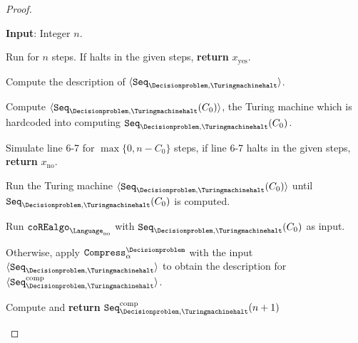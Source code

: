 \begin{proof}
\begin{algorithm}[H]
		\textbf{Input}: Integer $n$. 
		
		Run \Turingmachinehalt for $n$ steps. If \Turingmachinehalt halts in the given steps, \textbf{return} $x_{\text{yes}}$.
		
		Compute the description of $\langle \texttt{Seq}_{\Decisionproblem,\text{\Turingmachinehalt}} \rangle$.
		
		Compute $\langle \texttt{Seq}_{\Decisionproblem,\text{\Turingmachinehalt}}(C_0) \rangle$, the Turing machine which is hardcoded into computing $\texttt{Seq}_{\Decisionproblem,\text{\Turingmachinehalt}}(C_0)$.
		
		Simulate line 6-7 for $\max\{0, n - C_0\}$ steps, if line 6-7 halts in the given steps, \textbf{return} $x_{\text{no}}$.
		
		\Indp Run the Turing machine $\langle \texttt{Seq}_{\Decisionproblem,\text{\Turingmachinehalt}}(C_0) \rangle$ until  $\texttt{Seq}_{\Decisionproblem,\text{\Turingmachinehalt}}(C_0)$ is computed. 
		
		Run $\coREalgoproof$ with $\texttt{Seq}_{\Decisionproblem,\text{\Turingmachinehalt}}(C_0)$ as input. 
		
		\Indm Otherwise, apply $\texttt{Compress}_{\alpha}^{\Decisionproblem}$ with the input $\langle \texttt{Seq}_{\Decisionproblem,\text{\Turingmachinehalt}} \rangle$ to obtain the description for $\langle \texttt{Seq}_{\Decisionproblem,\text{\Turingmachinehalt}}^{\text{comp}} \rangle$.
		
		Compute and \textbf{return} $\texttt{Seq}_{\Decisionproblem,\text{\Turingmachinehalt}}^{\text{comp}}(n+1)$
		
		\caption{The description for $\texttt{Seq}_{\Decisionproblem,\text{\Turingmachinehalt}}$.}
		\label{pseu:REcompressibleproof}
	\end{algorithm}\DecMargin{1em}
	\vspace{10pt} 
		

\end{proof}
